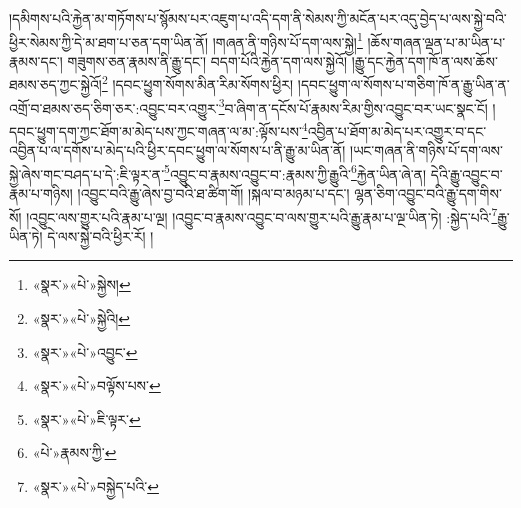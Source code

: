 །དམིགས་པའི་རྐྱེན་མ་གཏོགས་པ་སྙོམས་པར་འཇུག་པ་འདི་དག་ནི་སེམས་ཀྱི་མངོན་པར་འདུ་བྱེད་པ་ལས་སྐྱེ་བའི་ཕྱིར་སེམས་ཀྱི་དེ་མ་ཐག་པ་ཅན་དག་ཡིན་ནོ། །གཞན་ནི་གཉིས་པོ་དག་ལས་སྐྱེ།\footnote{«སྣར་»«པེ་»སྐྱེས།} །ཆོས་གཞན་ལྡན་པ་མ་ཡིན་པ་རྣམས་དང་། གཟུགས་ཅན་རྣམས་ནི་རྒྱུ་དང་། བདག་པོའི་རྐྱེན་དག་ལས་སྐྱེའོ། །རྒྱུ་དང་རྐྱེན་དག་ཁོ་ན་ལས་ཆོས་ཐམས་ཅད་ཀྱང་སྐྱེའོ།\footnote{«སྣར་»«པེ་»སྐྱེའི།} །དབང་ཕྱུག་སོགས་མིན་རིམ་སོགས་ཕྱིར། །དབང་ཕྱུག་ལ་སོགས་པ་གཅིག་ཁོ་ན་རྒྱུ་ཡིན་ན་འགྲོ་བ་ཐམས་ཅད་ཅིག་ཅར་:འབྱུང་བར་འགྱུར་\footnote{«སྣར་»«པེ་»འབྱུང་}བ་ཞིག་ན་དངོས་པོ་རྣམས་རིམ་གྱིས་འབྱུང་བར་ཡང་སྣང་ངོ། །དབང་ཕྱུག་དག་ཀྱང་ཐོག་མ་མེད་པས་ཀྱང་གཞན་ལ་མ་:ལྟོས་པས་\footnote{«སྣར་»«པེ་»བལྟོས་པས་}འབྱིན་པ་ཐོག་མ་མེད་པར་འགྱུར་བ་དང་འབྱིན་པ་ལ་དགོས་པ་མེད་པའི་ཕྱིར་དབང་ཕྱུག་ལ་སོགས་པ་ནི་རྒྱུ་མ་ཡིན་ནོ། །ཡང་གཞན་ནི་གཉིས་པོ་དག་ལས་སྐྱེ་ཞེས་གང་བཤད་པ་དེ་:ཇི་ལྟར་ན་\footnote{«སྣར་»«པེ་»ཇི་ལྟར་}འབྱུང་བ་རྣམས་འབྱུང་བ་:རྣམས་ཀྱི་རྒྱུའི་\footnote{«པེ་»རྣམས་ཀྱི་}རྐྱེན་ཡིན་ཞེ་ན། དེའི་རྒྱུ་འབྱུང་བ་རྣམ་པ་གཉིས། །འབྱུང་བའི་རྒྱུ་ཞེས་བྱ་བའི་ཐ་ཚིག་གོ། །སྐལ་བ་མཉམ་པ་དང་། ལྷན་ཅིག་འབྱུང་བའི་རྒྱུ་དག་གིས་སོ། །འབྱུང་ལས་གྱུར་པའི་རྣམ་པ་ལྔ། །འབྱུང་བ་རྣམས་འབྱུང་བ་ལས་གྱུར་པའི་རྒྱུ་རྣམ་པ་ལྔ་ཡིན་ཏེ། :སྐྱེད་པའི་\footnote{«སྣར་»«པེ་»བསྐྱེད་པའི་}རྒྱུ་ཡིན་ཏེ། དེ་ལས་སྐྱེ་བའི་ཕྱིར་རོ། །
